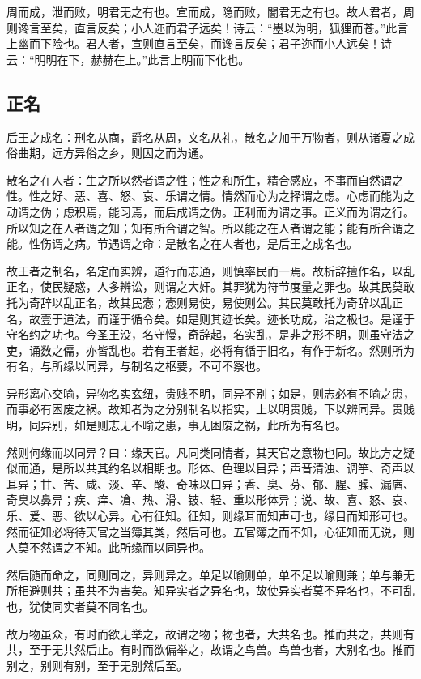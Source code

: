 \documentclass[]{article}
\begin{document}
周而成，泄而败，明君无之有也。宣而成，隐而败，闇君无之有也。故人君者，周则谗言至矣，直言反矣；小人迩而君子远矣！诗云：``墨以为明，狐狸而苍。''此言上幽而下险也。君人者，宣则直言至矣，而谗言反矣；君子迩而小人远矣！诗云：``明明在下，赫赫在上。''此言上明而下化也。

\hypertarget{header-n96}{%
\subsection{正名}\label{header-n96}}

后王之成名：刑名从商，爵名从周，文名从礼，散名之加于万物者，则从诸夏之成俗曲期，远方异俗之乡，则因之而为通。

散名之在人者：生之所以然者谓之性；性之和所生，精合感应，不事而自然谓之性。性之好、恶、喜、怒、哀、乐谓之情。情然而心为之择谓之虑。心虑而能为之动谓之伪；虑积焉，能习焉，而后成谓之伪。正利而为谓之事。正义而为谓之行。所以知之在人者谓之知；知有所合谓之智。所以能之在人者谓之能；能有所合谓之能。性伤谓之病。节遇谓之命：是散名之在人者也，是后王之成名也。

故王者之制名，名定而实辨，道行而志通，则慎率民而一焉。故析辞擅作名，以乱正名，使民疑惑，人多辨讼，则谓之大奸。其罪犹为符节度量之罪也。故其民莫敢托为奇辞以乱正名，故其民悫；悫则易使，易使则公。其民莫敢托为奇辞以乱正名，故壹于道法，而谨于循令矣。如是则其迹长矣。迹长功成，治之极也。是谨于守名约之功也。今圣王没，名守慢，奇辞起，名实乱，是非之形不明，则虽守法之吏，诵数之儒，亦皆乱也。若有王者起，必将有循于旧名，有作于新名。然则所为有名，与所缘以同异，与制名之枢要，不可不察也。

异形离心交喻，异物名实玄纽，贵贱不明，同异不别；如是，则志必有不喻之患，而事必有困废之祸。故知者为之分别制名以指实，上以明贵贱，下以辨同异。贵贱明，同异别，如是则志无不喻之患，事无困废之祸，此所为有名也。

然则何缘而以同异？曰：缘天官。凡同类同情者，其天官之意物也同。故比方之疑似而通，是所以共其约名以相期也。形体、色理以目异；声音清浊、调竽、奇声以耳异；甘、苦、咸、淡、辛、酸、奇味以口异；香、臭、芬、郁、腥、臊、漏庮、奇臭以鼻异；疾、痒、凔、热、滑、铍、轻、重以形体异；说、故、喜、怒、哀、乐、爱、恶、欲以心异。心有征知。征知，则缘耳而知声可也，缘目而知形可也。然而征知必将待天官之当簿其类，然后可也。五官簿之而不知，心征知而无说，则人莫不然谓之不知。此所缘而以同异也。

然后随而命之，同则同之，异则异之。单足以喻则单，单不足以喻则兼；单与兼无所相避则共；虽共不为害矣。知异实者之异名也，故使异实者莫不异名也，不可乱也，犹使同实者莫不同名也。

故万物虽众，有时而欲无举之，故谓之物；物也者，大共名也。推而共之，共则有共，至于无共然后止。有时而欲偏举之，故谓之鸟兽。鸟兽也者，大别名也。推而别之，别则有别，至于无别然后至。
\end{document}
